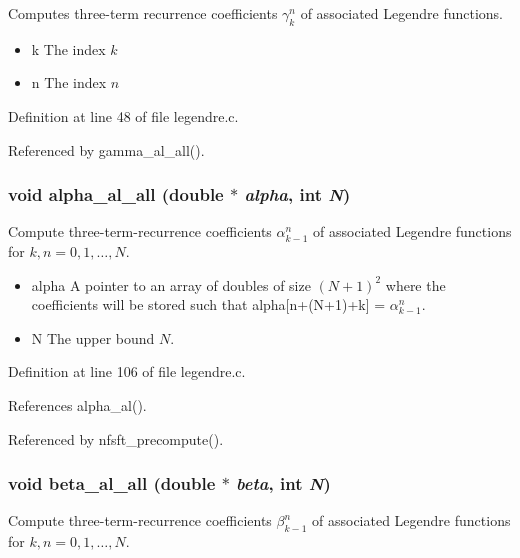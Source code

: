 Computes three-term recurrence coefficients $\gamma_k^n$ of associated Legendre functions. 

\begin{itemize}
\item k The index $k$ \item n The index $n$ \end{itemize}


Definition at line 48 of file legendre.c.

Referenced by gamma\_\-al\_\-all().\hypertarget{group__nfsft_ga18}{
\subsubsection[alpha\_\-al\_\-all]{\setlength{\rightskip}{0pt plus 5cm}void alpha\_\-al\_\-all (double $\ast$ {\em alpha}, int {\em N})}}
\label{group__nfsft_ga18}


Compute three-term-recurrence coefficients $\alpha_{k-1}^n$ of associated Legendre functions for $k,n = 0,1,\ldots,N$. 

\begin{itemize}
\item alpha A pointer to an array of doubles of size $(N+1)^2$ where the coefficients will be stored such that alpha\mbox{[}n+(N+1)+k\mbox{]} = $\alpha_{k-1}^n$. \item N The upper bound $N$. \end{itemize}


Definition at line 106 of file legendre.c.

References alpha\_\-al().

Referenced by nfsft\_\-precompute().\hypertarget{group__nfsft_ga19}{
\subsubsection[beta\_\-al\_\-all]{\setlength{\rightskip}{0pt plus 5cm}void beta\_\-al\_\-all (double $\ast$ {\em beta}, int {\em N})}}
\label{group__nfsft_ga19}


Compute three-term-recurrence coefficients $\beta_{k-1}^n$ of associated Legendre functions for $k,n = 0,1,\ldots,N$. 

